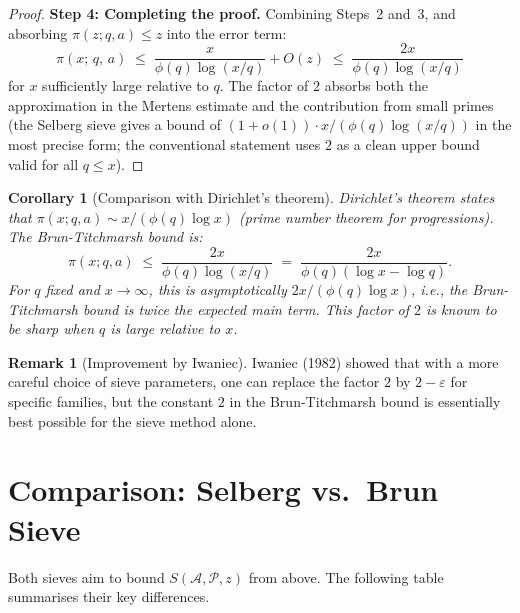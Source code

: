 \documentclass[12pt,a4paper]{amsart}
\newtheorem{corollary}[theorem]{Corollary}
\theoremstyle{definition}
\newtheorem{remark}[theorem]{Remark}
\begin{document}
\begin{proof}
  \textbf{Step 4: Completing the proof.}
  Combining Steps~2 and~3, and absorbing $\pi(z;q,a) \leq z$ into the
  error term:
  \[
    \pi(x;\,q,\,a)
    \;\leq\; \frac{x}{\phi(q)\log(x/q)} + O(z)
    \;\leq\; \frac{2x}{\phi(q)\log(x/q)}
  \]
  for $x$ sufficiently large relative to $q$.  The factor of $2$ absorbs
  both the approximation in the Mertens estimate and the contribution from
  small primes (the Selberg sieve gives a bound of $(1+o(1)) \cdot x/(\phi(q)\log(x/q))$
  in the most precise form; the conventional statement uses $2$ as a clean
  upper bound valid for all $q \leq x$).
\end{proof}

\begin{corollary}[Comparison with Dirichlet's theorem]\label{cor:dirichlet}
  Dirichlet's theorem states that $\pi(x;q,a) \sim x/(\phi(q)\log x)$ (prime
  number theorem for progressions).  The Brun-Titchmarsh bound is:
  \[
    \pi(x;q,a) \;\leq\; \frac{2x}{\phi(q)\log(x/q)} \;=\; \frac{2x}{\phi(q)(\log x - \log q)}.
  \]
  For $q$ fixed and $x \to \infty$, this is asymptotically $2x/(\phi(q)\log x)$,
  i.e., the Brun-Titchmarsh bound is \emph{twice} the expected main term.
  This factor of $2$ is known to be sharp when $q$ is large relative to $x$.
\end{corollary}

\begin{remark}[Improvement by Iwaniec]
  Iwaniec (1982) showed that with a more careful choice of sieve parameters,
  one can replace the factor $2$ by $2-\varepsilon$ for specific families,
  but the constant $2$ in the Brun-Titchmarsh bound is essentially best possible
  for the sieve method alone.
\end{remark}

\section{Comparison: Selberg vs.\ Brun Sieve}
\label{sec:comparison}

Both sieves aim to bound $S(\mathcal{A},\mathcal{P},z)$ from above.  The
following table summarises their key differences.
\end{document}
